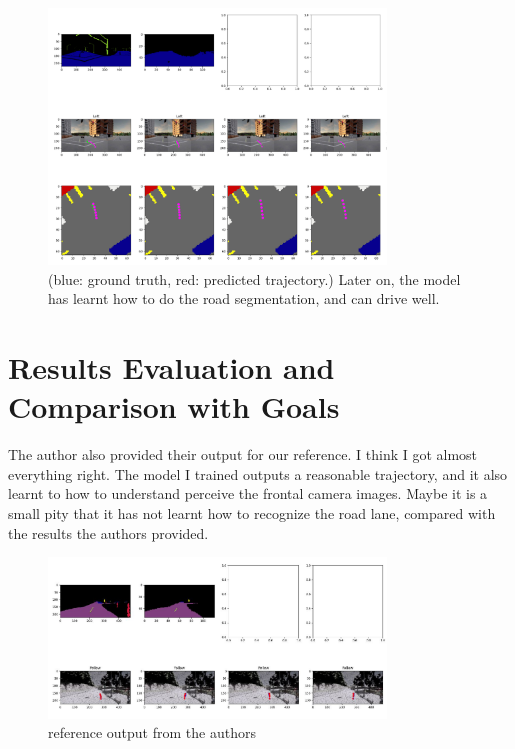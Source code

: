 \documentclass[inputenc=utf8]{ldvarticle}
\begin{document}
\begin{figure}[H]
  \centering
  \includegraphics[width=0.8\textwidth] {bilder/northern_pyramid_683.png} 
  \caption{(blue: ground truth, red: predicted trajectory.) Later on, the model has learnt how to do the road segmentation, and can drive well.}
\end{figure}

\section {Results Evaluation and Comparison with Goals}
The author also provided their output for our reference. I think I got almost everything right. The model I trained outputs a reasonable trajectory, and it also learnt to how to understand perceive the frontal camera images. Maybe it is a small pity that it has not learnt how to recognize the road lane, compared with the results the authors provided.
\begin{figure}[H]
  \centering
  \includegraphics[width=0.8\textwidth] {bilder/lbc.jpg} 
  \caption{reference output from the authors}
\end{figure}
\end{document}

